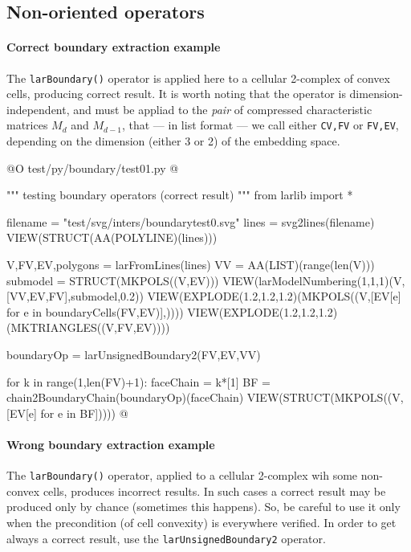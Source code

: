 \documentclass[11pt,oneside]{article}    %
\begin{document}
\subsection{Non-oriented operators}

\paragraph{Correct boundary extraction example}

The \texttt{larBoundary()} operator is applied here to a cellular 2-complex of convex cells, producing correct result. It is worth noting that the operator is dimension-independent, and must be appliad to the \emph{pair} of compressed characteristic matrices $M_d$ and $M_{d-1}$, that --- in list format --- we call either \texttt{CV,FV} or  \texttt{FV,EV}, depending on the dimension (either 3 or 2) of the embedding space.

@O test/py/boundary/test01.py
@{""" testing boundary operators (correct result) """
from larlib import *

filename = "test/svg/inters/boundarytest0.svg"
lines = svg2lines(filename)
VIEW(STRUCT(AA(POLYLINE)(lines)))
    
V,FV,EV,polygons = larFromLines(lines)
VV = AA(LIST)(range(len(V)))
submodel = STRUCT(MKPOLS((V,EV)))
VIEW(larModelNumbering(1,1,1)(V,[VV,EV,FV],submodel,0.2))
VIEW(EXPLODE(1.2,1.2,1.2)(MKPOLS((V,[EV[e] for e in boundaryCells(FV,EV)],))))
VIEW(EXPLODE(1.2,1.2,1.2)(MKTRIANGLES((V,FV,EV))))

boundaryOp = larUnsignedBoundary2(FV,EV,VV)

for k in range(1,len(FV)+1):
    faceChain = k*[1]
    BF = chain2BoundaryChain(boundaryOp)(faceChain)
    VIEW(STRUCT(MKPOLS((V,[EV[e] for e in BF]))))
@}

\paragraph{Wrong boundary extraction example}

The \texttt{larBoundary()} operator, applied  to a cellular 2-complex wih some non-convex cells, produces incorrect results. In such cases a correct result may be produced only by chance (sometimes this happens). So, be careful to use it only when the precondition (of cell convexity) is everywhere verified. In order to get always a correct result, use the \texttt{larUnsignedBoundary2} operator.
\end{document}
